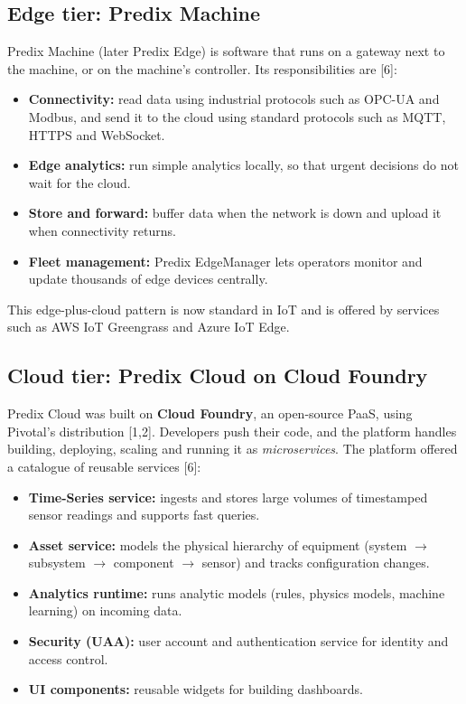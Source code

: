 \documentclass[12pt,a4paper]{article}
\begin{document}
\subsection{Edge tier: Predix Machine}
Predix Machine (later Predix Edge) is software that runs on a gateway next to the machine, or on the machine's controller.
Its responsibilities are [6]:
\begin{itemize}
  \item \textbf{Connectivity:} read data using industrial protocols such as OPC-UA and Modbus, and send it to the cloud
        using standard protocols such as MQTT, HTTPS and WebSocket.
  \item \textbf{Edge analytics:} run simple analytics locally, so that urgent decisions do not wait for the cloud.
  \item \textbf{Store and forward:} buffer data when the network is down and upload it when connectivity returns.
  \item \textbf{Fleet management:} Predix EdgeManager lets operators monitor and update thousands of edge devices centrally.
\end{itemize}
This edge-plus-cloud pattern is now standard in IoT and is offered by services such as AWS IoT Greengrass and Azure IoT Edge.

\subsection{Cloud tier: Predix Cloud on Cloud Foundry}
Predix Cloud was built on \textbf{Cloud Foundry}, an open-source PaaS, using Pivotal's distribution [1,2]. Developers
push their code, and the platform handles building, deploying, scaling and running it as \emph{microservices}. The
platform offered a catalogue of reusable services [6]:
\begin{itemize}
  \item \textbf{Time-Series service:} ingests and stores large volumes of timestamped sensor readings and supports fast queries.
  \item \textbf{Asset service:} models the physical hierarchy of equipment (system $\rightarrow$ subsystem $\rightarrow$ component $\rightarrow$ sensor) and tracks configuration changes.
  \item \textbf{Analytics runtime:} runs analytic models (rules, physics models, machine learning) on incoming data.
  \item \textbf{Security (UAA):} user account and authentication service for identity and access control.
  \item \textbf{UI components:} reusable widgets for building dashboards.
\end{itemize}
\end{document}
